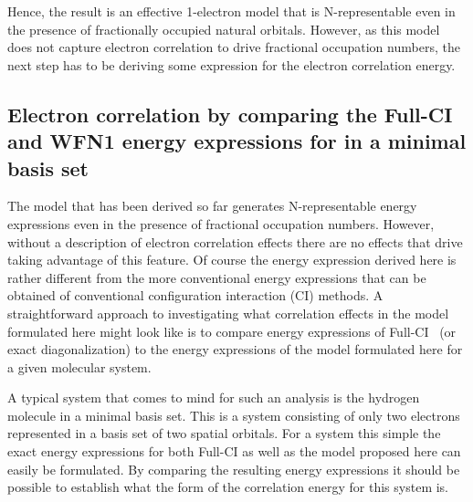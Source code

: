\documentclass[pra,nofootinbib]{revtex4-1}
\newcommand{\dlabel}[1]{\text{#1}\label{#1}}
\begin{document}
Hence, the result is an effective 1-electron model that is N-representable
even in the presence of fractionally occupied natural orbitals. However,
as this model does not capture electron correlation to drive fractional
occupation numbers, the next step has to be deriving some expression
for the electron correlation energy.

\subsection{Electron correlation by comparing the Full-CI and WFN1 energy expressions for  in
            a minimal basis set}
\dlabel{sect:FCI:H2:min}

The model that has been derived so far generates N-representable energy expressions even
in the presence of fractional occupation numbers. However, without a description of 
electron correlation effects there are no effects that drive taking advantage of this
feature. Of course the energy expression derived here is rather different from the 
more conventional energy expressions that can be obtained of conventional configuration
interaction (CI) methods. A straightforward approach to investigating what correlation 
effects in the model formulated here might look like is to compare energy expressions
of Full-CI~\cite{Ross_1952} (or exact diagonalization) to the energy expressions of the model 
formulated here for a given molecular system.

A typical system that comes to mind for such an analysis is the hydrogen molecule in a 
minimal basis set. This is a system consisting of only two electrons represented in a basis
set of two spatial orbitals. For a system this simple the exact energy expressions for both
Full-CI as well as the model proposed here can easily be formulated. By comparing the 
resulting energy expressions it should be possible to establish what the form of the
correlation energy for this system is.
\end{document}
